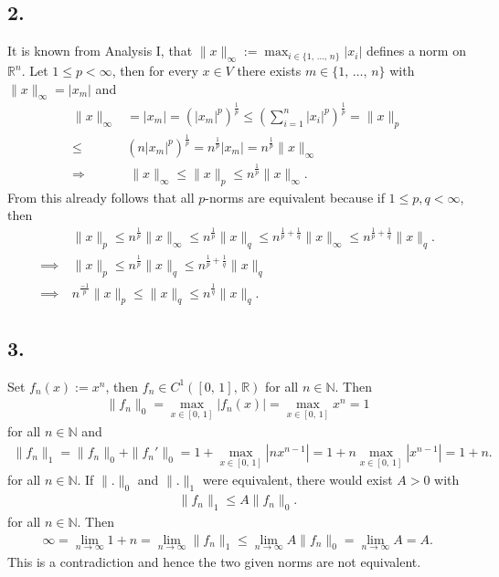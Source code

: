 \documentclass{article}
\begin{document}
\subsection*{2.}
It is known from Analysis I, that $\| x \|_{\infty}:= \max_{i \in \{1,\, \dots ,\, n\}}|x_{i}|$ defines a norm on $\mathbb{R}^{n}$.
Let $1 \leq p < \infty$, then for every $x \in V$ there exists $m \in \{ 1, \, \dots ,\, n\}$ with $\| x \|_{\infty} = |x_{m}|$ and
\begin{align*}
  \|x\|_{\infty} & = |x_{m}| = \left(|x_{m}|^{p} \right)^{\frac{1}{p}} \leq \left(\sum_{i = 1}^{n} |x_{i}|^{p} \right)^{\frac{1}{p}} = \|x \|_{p} \\
  \leq & \left(n |x_{m}|^{p}\right)^{\frac{1}{p}} = n^{\frac{1}{p}} |x_{m}| = n^{\frac{1}{p}} \|x\|_{\infty} \\
  \Rightarrow & \ \|x\|_{\infty} \leq \|x\|_{p} \leq n^{\frac{1}{p}} \|x\|_{\infty}.
\end{align*}
From this already follows that all $p$-norms are equivalent because if $1 \leq p , q < \infty$, then
\begin{align*}
  & \|x\|_{p} \leq n^{\frac{1}{p}} \|x\|_{\infty} \leq n^{\frac{1}{p}} \|x\|_{q} \leq n^{\frac{1}{p} + \frac{1}{q}} \|x\|_{\infty} \leq n^{\frac{1}{p} + \frac{1}{q}} \|x\|_{q}. \\
  \implies \ & \|x\|_{p} \leq n^{\frac{1}{p}} \|x\|_{q} \leq n^{\frac{1}{p} + \frac{1}{q}} \|x \|_{q} \\
  \implies \ & n^{\frac{-1}{p}} \|x\|_{p} \leq \|x\|_{q} \leq n^{\frac{1}{q}}\|x\|_{q}.
\end{align*}

\subsection*{3.}
Set $f_{n}(x) := x^{n}$, then $f_{n} \in C^{1}([0,\, 1],\, \mathbb{R})$ for all $n \in \mathbb{N}$.
Then
\begin{align*}
  \|f_{n}\|_{0} = \max_{x \in [0, \, 1]} |f_{n}(x)| = \max_{x \in [0 ,\, 1]} x^{n} = 1
\end{align*}
for all $n \in \mathbb{N}$ and
\begin{align*}
 \|f_{n}\|_{1} = \|f_{n}\|_{0} + \|f_{n}'\|_{0} = 1 + \max_{x \in [0 ,\, 1]} |nx^{n-1}| = 1 + n\max_{x \in [0 ,\, 1]} |x^{n-1}| = 1 + n. 
\end{align*}
for all $n \in \mathbb{N}$.
If $\|.\|_{0}$ and $\|.\|_{1}$ were equivalent, there would exist $A > 0$ with
\begin{align*}
  \|f_{n}\|_{1} \leq A \|f_{n}\|_{0}.
\end{align*}
for all $n \in \mathbb{N}$.
Then
\begin{align*}
  \infty =  \lim_{n \rightarrow \infty} 1 + n = \lim_{n \rightarrow \infty} \|f_{n}\|_{1} \leq \lim_{n \rightarrow \infty} A \|f_{n}\|_{0} = \lim_{n \rightarrow \infty} A = A.
\end{align*}
This is a contradiction and hence the two given norms are not equivalent.
\end{document}
